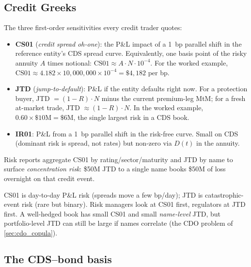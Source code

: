 \subsection{Credit Greeks}
\label{sec:credit_greeks}

The three first-order sensitivities every credit trader quotes:

\begin{itemize}
  \item \textbf{CS01} (\emph{credit spread oh-one}): the P\&L
    impact of a 1~bp parallel shift in the reference entity's CDS
    spread curve.  Equivalently, one basis point of the risky
    annuity $A$ times notional: $\mathrm{CS01} \approx A \cdot N
    \cdot 10^{-4}$.  For the worked example,
    $\mathrm{CS01} \approx 4.182 \times 10{,}000{,}000 \times
    10^{-4} = \$4{,}182$ per bp.
  \item \textbf{JTD} (\emph{jump-to-default}): P\&L if the entity
    defaults right now.  For a protection buyer, JTD $= (1-R) \cdot
    N$ minus the current premium-leg MtM; for a fresh at-market
    trade, JTD $\approx (1-R) \cdot N$.  In the worked example,
    $0.60 \times \$10\mathrm{M} = \$6\mathrm{M}$, the single
    largest risk in a CDS book.
  \item \textbf{IR01}: P\&L from a 1~bp parallel shift in the
    risk-free curve.  Small on CDS (dominant risk is spread, not
    rates) but non-zero via $D(t)$ in the annuity.
\end{itemize}

Risk reports aggregate CS01 by rating/sector/maturity and JTD by
name to surface \emph{concentration risk}: \$50M JTD to a single
name books \$50M of loss overnight on that credit event.

\begin{intuitionbox}
CS01 is day-to-day P\&L risk (spreads move a few bp/day); JTD is
catastrophic-event risk (rare but binary).  Risk managers look at
CS01 first, regulators at JTD first.  A well-hedged book has small
CS01 and small \emph{name-level} JTD, but portfolio-level JTD
can still be large if names correlate (the CDO problem of
\cref{sec:cdo_copula}).
\end{intuitionbox}

\subsection{The CDS--bond basis}
\label{sec:cds_bond_basis}

